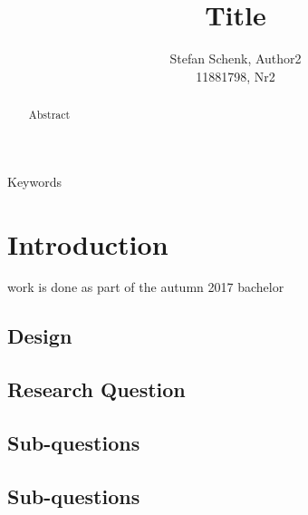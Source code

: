 \documentclass[journal]{IEEEtran}
\begin{document}
  \title{Title}
  \author{Stefan Schenk, Author2\\ 11881798, Nr2}



  \maketitle

  \begin{abstract}
  Abstract
  \end{abstract}

  \begin{IEEEkeywords}
  Keywords
  \end{IEEEkeywords}

  \section{Introduction}
   work is done as part of the autumn 2017 bachelor

  \subsection{Design}

  \subsection{Research Question}

  \subsection{Sub-questions}

  \subsection{Sub-questions}

\end{document}

